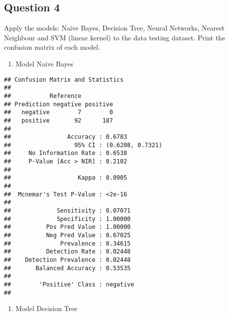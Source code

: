 \documentclass[]{article}
\newenvironment{Shaded}{\begin{snugshade}}{\end{snugshade}}
\newcommand{\DataTypeTok}[1]{\textcolor[rgb]{0.13,0.29,0.53}{#1}}
\newcommand{\KeywordTok}[1]{\textcolor[rgb]{0.13,0.29,0.53}{\textbf{#1}}}
\newcommand{\NormalTok}[1]{#1}
\newcommand{\OperatorTok}[1]{\textcolor[rgb]{0.81,0.36,0.00}{\textbf{#1}}}
\newcommand{\StringTok}[1]{\textcolor[rgb]{0.31,0.60,0.02}{#1}}
\providecommand{\tightlist}{%
  \setlength{\itemsep}{0pt}\setlength{\parskip}{0pt}}
\begin{document}
\hypertarget{question-4}{%
\subsection{Question 4}\label{question-4}}

Apply the models: Naive Bayes, Decision Tree, Neural Networks, Nearest
Neighbour and SVM (linear kernel) to the data testing dataset. Print the
confusion matrix of each model.

\begin{enumerate}
\def\labelenumi{\arabic{enumi}.}
\tightlist
\item
  Model Naive Bayes
\end{enumerate}

\begin{Shaded}
\end{Shaded}

\begin{verbatim}
## Confusion Matrix and Statistics
## 
##           Reference
## Prediction negative positive
##   negative        7        0
##   positive       92      187
##                                           
##                Accuracy : 0.6783          
##                  95% CI : (0.6208, 0.7321)
##     No Information Rate : 0.6538          
##     P-Value [Acc > NIR] : 0.2102          
##                                           
##                   Kappa : 0.0905          
##                                           
##  Mcnemar's Test P-Value : <2e-16          
##                                           
##             Sensitivity : 0.07071         
##             Specificity : 1.00000         
##          Pos Pred Value : 1.00000         
##          Neg Pred Value : 0.67025         
##              Prevalence : 0.34615         
##          Detection Rate : 0.02448         
##    Detection Prevalence : 0.02448         
##       Balanced Accuracy : 0.53535         
##                                           
##        'Positive' Class : negative        
## 
\end{verbatim}

\begin{enumerate}
\def\labelenumi{\arabic{enumi}.}
\setcounter{enumi}{1}
\tightlist
\item
  Model Decision Tree
\end{enumerate}
\end{document}
